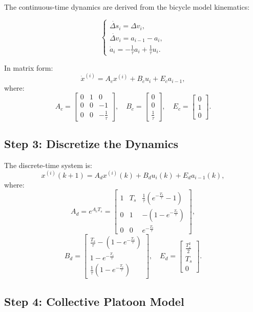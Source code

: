 \documentclass{article}
\begin{document}
The continuous-time dynamics are derived from the bicycle model kinematics:

\[
\begin{cases}
\dot{\Delta s}_i = \Delta v_i, \\
\dot{\Delta v}_i = a_{i-1} - a_i, \\
\dot{a}_i = -\frac{1}{\tau} a_i + \frac{1}{\tau} u_i.
\end{cases}
\]

In matrix form:
\[
\dot{x}^{(i)} = A_c x^{(i)} + B_c u_i + E_c a_{i-1},
\]
where:
\[
A_c = \begin{bmatrix} 0 & 1 & 0 \\ 0 & 0 & -1 \\ 0 & 0 & -\frac{1}{\tau} \end{bmatrix}, \quad 
B_c = \begin{bmatrix} 0 \\ 0 \\ \frac{1}{\tau} \end{bmatrix}, \quad 
E_c = \begin{bmatrix} 0 \\ 1 \\ 0 \end{bmatrix}.
\]

\subsection{Step 3: Discretize the Dynamics}

The discrete-time system is:
\[
x^{(i)}(k+1) = A_d x^{(i)}(k) + B_d u_i(k) + E_d a_{i-1}(k),
\]
where:
\[
A_d = e^{A_c T_s} = \begin{bmatrix} 
1 & T_s & \frac{1}{\tau} (e^{-\frac{T_s}{\tau}} - 1) \\ 
0 & 1 & -(1 - e^{-\frac{T_s}{\tau}}) \\ 
0 & 0 & e^{-\frac{T_s}{\tau}} 
\end{bmatrix},
\]
\[
B_d = \begin{bmatrix} 
\frac{T_s}{\tau} - (1 - e^{-\frac{T_s}{\tau}}) \\ 
1 - e^{-\frac{T_s}{\tau}} \\ 
\frac{1}{\tau} (1 - e^{-\frac{T_s}{\tau}}) 
\end{bmatrix}, \quad
E_d = \begin{bmatrix} \frac{T_s^2}{2} \\ T_s \\ 0 \end{bmatrix}.
\]

\subsection{Step 4: Collective Platoon Model}
\end{document}
